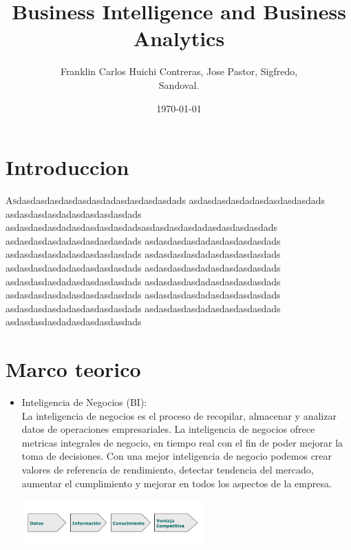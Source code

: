 \documentclass[twoside,twocolumn]{article}
\title{Business Intelligence and Business Analytics}
\author{Franklin Carlos Huichi Contreras, Jose Pastor, Sigfredo, \\
 Sandoval. }
\date{\today}
\begin{document}
\maketitle


\section{Introduccion}
\lettrine[nindent=0em,lines=3]{A}sdasdasdasdasdasdasdadasdasdasdasdads asdasdasdasdadasdasdasdasdads asdasdasdasdadasdasdasdasdads asdasdasdasdadasdasdasdasdadsasdasdasdasdadasdasdasdasdads asdasdasdasdadasdasdasdasdads asdasdasdasdadasdasdasdasdads asdasdasdasdadasdasdasdasdads asdasdasdasdadasdasdasdasdads asdasdasdasdadasdasdasdasdads asdasdasdasdadasdasdasdasdads asdasdasdasdadasdasdasdasdads asdasdasdasdadasdasdasdasdads asdasdasdasdadasdasdasdasdads asdasdasdasdadasdasdasdasdads asdasdasdasdadasdasdasdasdads asdasdasdasdadasdasdasdasdads asdasdasdasdadasdasdasdasdads




\section{Marco teorico}

\begin{itemize}
\item Inteligencia de Negocios (BI): \\ 
La inteligencia de negocios es el proceso de recopilar, almacenar y analizar datos de operaciones empresariales. La inteligencia de negocios ofrece metricas integrales de negocio,
en tiempo real con el fin de poder mejorar la toma de decisiones. Con una mejor inteligencia de negocio podemos crear valores de referencia de rendimiento, detectar tendencia del mercado,
aumentar el cumplimiento y mejorar en todos los aspectos de la empresa.
\begin{center}
	\includegraphics[width=7cm]{./Imagenes/bi} 
\end{center}


\end{itemize}
\end{document}

